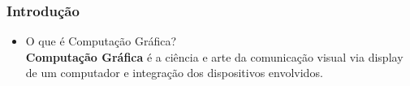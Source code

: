 \documentclass{beamer}
\begin{document}
\begin{frame}
\frametitle{Introdução}

\begin{itemize}
	\item O que é Computação Gráfica? \\
	\textbf{Computação Gráfica} é a ciência e arte da comunicação visual via display de um computador e integração dos dispositivos envolvidos.
	\begin{figure}[htb!]
  \centering
    \qquad
   \qquad
  \caption{}
  \label{iep}
\end{figure}

\end{itemize}
\end{frame}

\end{document}

